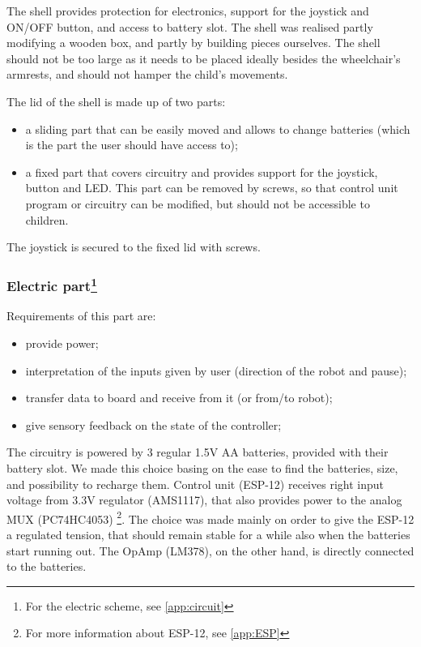 \documentclass[a4paper,twoside]{book}
\begin{document}
The shell provides protection for electronics, support for the joystick and ON/OFF button, and access to battery slot. The shell was realised partly modifying a wooden box, and partly by building pieces ourselves. The shell should not be too large as it needs to be placed ideally besides the wheelchair's armrests, and should not hamper the child's movements.

\beforelist The lid of the shell is made up of two parts:
\begin{itemize}
\item a sliding part that can be easily moved and allows to change batteries (which is the part the user should have access to);
\item a fixed part that covers circuitry and provides support for the joystick, button and LED. This part can be removed by screws, so that control unit program or circuitry can be modified, but should not be accessible to children.
\end{itemize}
\afterlist
The joystick is secured to the fixed lid with screws.

\subsubsection[Electric part]{Electric part\footnote{For the electric scheme, see \autoref{app:circuit}}}
\beforelist Requirements of this part are: 
\begin{itemize}
\item provide power;
\item interpretation of the inputs given by user (direction of the robot and pause);
\item transfer data to board and receive from it (or from/to robot);
\item give sensory feedback on the state of the controller;
\end{itemize}
\afterlist*
The circuitry is powered by 3 regular 1.5V AA batteries, provided with their battery slot. We made this choice basing on the ease to find the batteries, size, and possibility to recharge them. Control unit (ESP-12) receives right input voltage from 3.3V regulator (AMS1117), that also provides power to the analog MUX (PC74HC4053)%
\footnote{For more information about ESP-12, see \autoref{app:ESP}}.
The choice was made mainly on order to give the ESP-12 a regulated tension, that should remain stable for a while also when the batteries start running out. The OpAmp (LM378), on the other hand, is directly connected to the batteries.
\end{document}
